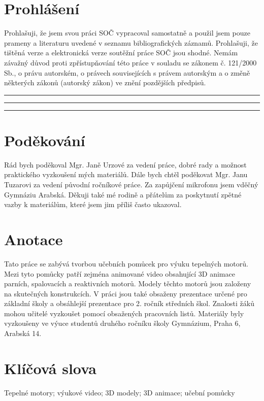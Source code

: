 \newpage

\section*{Prohlášení}
{Prohlašuji, že jsem svou práci SOČ vypracoval samostatně a použil jsem pouze prameny a literaturu uvedené v seznamu bibliografických záznamů.}\odst
{Prohlašuji, že tištěná verze a elektronická verze soutěžní práce SOČ jsou shodné.}\odst
{Nemám závažný důvod proti zpřístupňování této práce v souladu se zákonem č. 121/2000 Sb., o právu autorském, o právech souvisejících s právem autorským a o změně některých zákonů (autorský zákon) ve znění pozdějších předpisů.}\par
\vspace{2cm}
\noindent\rule{3cm}{0.4pt}
\noindent\rule{3cm}{0.4pt}
\hfill
{}
\noindent\rule{5cm}{0.4pt}

\newpage

\section*{Poděkování}
{Rád bych poděkoval Mgr. Janě Urzové za vedení práce, dobré rady a možnost praktického vyzkoušení mých materiálů. Dále bych chtěl poděkovat  Mgr. Janu Tuzarovi za vedení původní ročníkové práce. Za zapůjčení mikrofonu jsem vděčný Gymnáziu Arabská. Děkuji také mé rodině a přátelům za poskytnutí zpětné vazby k materiálům, které jsem jim příliš často ukazoval.}

\newpage

\section*{Anotace}
{Tato práce se zabývá tvorbou učebních pomůcek pro výuku tepelných motorů. Mezi tyto pomůcky patří zejména animované video obsahující 3D animace parních, spalovacích a reaktivních motorů. Modely těchto motorů jsou založeny na skutečných konstrukcích. V práci jsou také obsaženy prezentace určené pro základní školy a obsáhlejší prezentace pro 2. ročník středních škol. Znalosti žáků mohou učitelé vyzkoušet pomocí obsažených pracovních listů. Materiály byly vyzkoušeny ve výuce studentů druhého ročníku školy Gymnázium, Praha 6, Arabská 14.}

\section*{Klíčová slova}
{Tepelné motory; výukové video; 3D modely; 3D animace; učební pomůcky}

